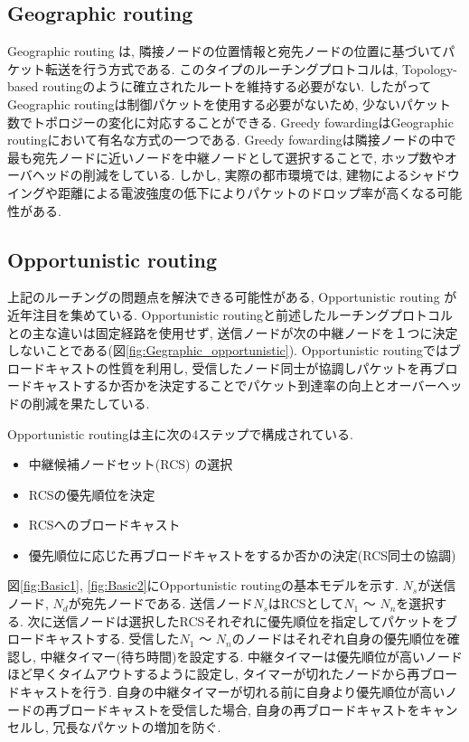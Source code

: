 \documentclass[10pt]{jreport}
\begin{document}
\subsection{Geographic routing}
\label{Geographic}
Geographic routing\cite{6,7,8,9,10,11,12,13,14,15} は, 隣接ノードの位置情報と宛先ノードの位置に基づいてパケット転送を行う方式である. このタイプのルーチングプロトコルは, Topology-based routingのように確立されたルートを維持する必要がない. したがってGeographic routingは制御パケットを使用する必要がないため, 少ないパケット数でトポロジーの変化に対応することができる. Greedy fowardingはGeographic routingにおいて有名な方式の一つである. Greedy fowardingは隣接ノードの中で最も宛先ノードに近いノードを中継ノードとして選択することで, ホップ数やオーバヘッドの削減をしている. しかし, 実際の都市環境では, 建物によるシャドウイングや距離による電波強度の低下によりパケットのドロップ率が高くなる可能性がある. 

\subsection{Opportunistic routing}
\label{Opportunistic}
上記のルーチングの問題点を解決できる可能性がある, Opportunistic routing\cite{16} が近年注目を集めている. Opportunistic routingと前述したルーチングプロトコルとの主な違いは固定経路を使用せず, 送信ノードが次の中継ノードを１つに決定しないことである(図\ref{fig:Gegraphic_opportunistic}). Opportunistic routingではブロードキャストの性質を利用し, 受信したノード同士が協調しパケットを再ブロードキャストするか否かを決定することでパケット到達率の向上とオーバーヘッドの削減を果たしている. 

Opportunistic routingは主に次の4ステップで構成されている.

\begin{itemize}
	\item 中継候補ノードセット(RCS) の選択
	\item RCSの優先順位を決定
	\item RCSへのブロードキャスト
	\item 優先順位に応じた再ブロードキャストをするか否かの決定(RCS同士の協調)
\end{itemize}

図\ref{fig:Basic1}, \ref{fig:Basic2}にOpportunistic routingの基本モデルを示す.
$N_{s}$が送信ノード, $N_{d}$が宛先ノードである. 送信ノード$N_{s}$はRCSとして$N_{1}$ ～ $N_{n}$を選択する. 次に送信ノードは選択したRCSそれぞれに優先順位を指定してパケットをブロードキャストする. 受信した$N_{1}$ ～ $N_{n}$のノードはそれぞれ自身の優先順位を確認し, 中継タイマー(待ち時間)を設定する. 中継タイマーは優先順位が高いノードほど早くタイムアウトするように設定し, タイマーが切れたノードから再ブロードキャストを行う. 自身の中継タイマーが切れる前に自身より優先順位が高いノードの再ブロードキャストを受信した場合, 自身の再ブロードキャストをキャンセルし, 冗長なパケットの増加を防ぐ.
 
\end{document}
